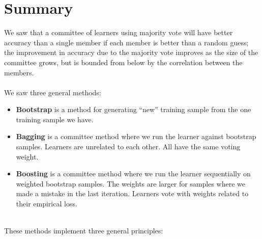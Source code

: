 \section{Summary}
We saw that a committee of learners using majority vote 
will have better accuracy than a single
member if each member is better than a random guess; the improvement in accuracy
due to the majority vote improves as the size of the committee grows, but is
bounded from below by the correlation between the members.
\\~\\
We saw three general methods:
\begin{itemize}
  \item {\bf Bootstrap} is a method for generating ``new'' training sample from
    the one training sample we have.
  \item {\bf Bagging} is a committee method where we run the learner against
    bootstrap samples. Learners are unrelated to each other. All have the same
    voting weight.
  \item {\bf Boosting} is a committee method where we run the learner
    sequentially on weighted bootstrap samples. The weights are larger for
    samples where we made a mistake in the last iteration. Learners vote with
    weights related to their empirical loss.
\end{itemize}
~\\
These methods implement three general principles: 
